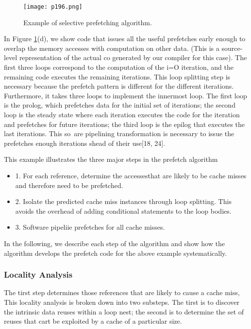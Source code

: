 \begin{figure}[H]
	\centering
	\texttt{[image: p196.png]}
	\caption{Example of selective prefetching algorithm.}
	\label{fig:p196}
\end{figure}

In Figure \ref{fig:p196}(d), we show code that issues all the useful prefetches
early enough to overlap the memory accesses with computation on
other data. (This is a source-level representation of the actual co
generated by our compiler for this case). 
The first three loops correspond to the computation 
of the i=O iteration, and the remaining
code executes the remaining iterations. 
This loop splitting step is
necessary because the prefetch pattern is different 
for the different
iterations. Furthermore, 
it takes three loops to implement the innermost loop. The first 
loop is the prolog, which prefetches data for
the initial set of iterations; the second loop is the steady state where
each iteration executes the code for the iteration and prefetches for
future iterations; the third loop is the epilog that executes the last
iterations. This so~are pipelining transformation is necessary to
issue the prefetches enough iterations shead of their use[18, 24].

This example illustrates the three major steps in the prefetch
algorithm
\begin{itemize}


\item 1. For each reference, determine the accessesthat are likely to be
cache misses and therefore need to be prefetched.
\item 2. Isolate the predicted cache miss instances through loop splitting. This avoids the overhead of adding conditional statements
to the loop bodies.
\item 3. Software pipeliie prefetches for all cache misses.

\end{itemize}

In the following, we describe each step of the algorithm and show
how the algorithm develops the prefetch code for the above example
systematically.

\subsubsection{Locality Analysis}

The tirst step determines those references that are likely to cause a
cache miss, This locality analysis is broken down into two substeps.
The tirst is to discover the intrinsic data reuses within a loop nest;
the second is to determine the set of reuses that cart be exploited
by a cache of a particular size.



